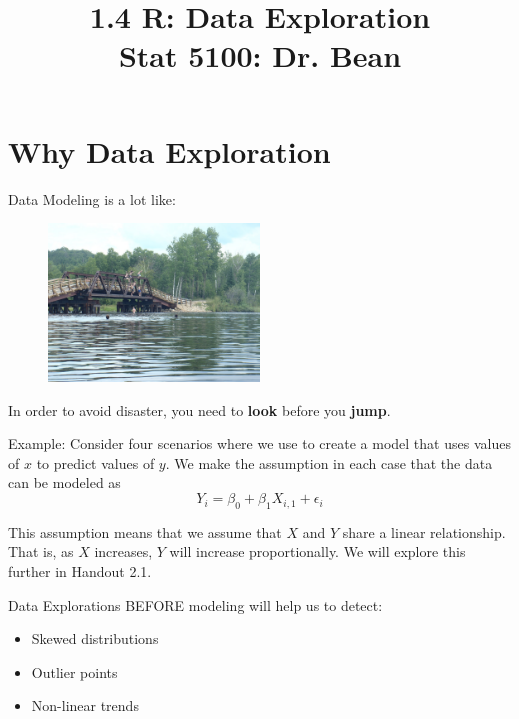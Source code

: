 \documentclass{article}\usepackage[]{graphicx}\usepackage[]{color}
\begin{document}
\title{%
  1.4 R: Data Exploration \\
  \smallskip
  \large Stat 5100: Dr. Bean
}
\date{}

\maketitle

\section{Why Data Exploration}

Data Modeling is a lot like:

\begin{figure}[H]
\centering
\includegraphics[width=0.5\textwidth]{../figures/module1/bridgeJumping.jpg}
\end{figure}

In order to avoid disaster, you need to \textbf{look} before you \textbf{jump}.

\nspace
Example:
Consider four scenarios where we use to create a model that uses values of $x$ to predict values of $y$. We make the assumption in each case that the data can be modeled as
\begin{equation}
Y_i = \beta_0 + \beta_1X_{i,1} + \epsilon_i
\end{equation}

This assumption means that we assume that $X$ and $Y$ share a linear relationship. That is, as $X$ increases, $Y$ will increase proportionally. We will explore this further in Handout 2.1.

\nspace
Data Explorations BEFORE modeling will help us to detect:
\begin{itemize}
\item Skewed distributions
\item Outlier points
\item Non-linear trends
\end{itemize}
\end{document}
